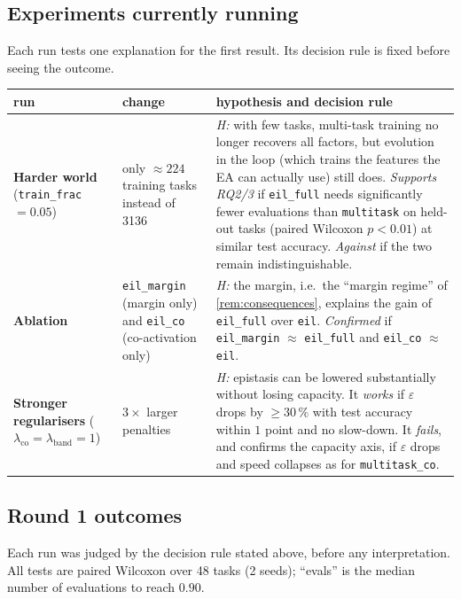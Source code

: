 \documentclass[11pt,a4paper]{article}
\theoremstyle{definition}
\theoremstyle{plain}
\theoremstyle{remark}
\begin{document}
\subsection{Experiments currently running}
Each run tests one explanation for the first result. Its decision rule is fixed before seeing the outcome.

\begin{center}
\small
\begin{tabularx}{\linewidth}{@{}L{2.4cm}L{3.6cm}Y@{}}
\toprule
run & change & hypothesis and decision rule \\
\midrule
\textbf{Harder world} (\texttt{train\_frac}$=0.05$) & only $\approx224$ training tasks instead of 3136 & \emph{H:} with few tasks, multi-task training no longer recovers all factors, but evolution in the loop (which trains the features the EA can actually use) still does.
\emph{Supports RQ2/3} if \texttt{eil\_full} needs significantly fewer evaluations than \texttt{multitask} on held-out tasks (paired Wilcoxon $p<0.01$) at similar test accuracy. \emph{Against} if the two remain indistinguishable. \\
\textbf{Ablation} & \texttt{eil\_margin} (margin only) and \texttt{eil\_co} (co-activation only) & \emph{H:} the margin, i.e.\ the ``margin regime'' of \cref{rem:consequences}, explains the gain of \texttt{eil\_full} over \texttt{eil}.
\emph{Confirmed} if \texttt{eil\_margin} $\approx$ \texttt{eil\_full} and \texttt{eil\_co} $\approx$ \texttt{eil}. \\
\textbf{Stronger regularisers} ($\lambda_{\text{co}}=\lambda_{\text{band}}=1$) & $3\times$ larger penalties & \emph{H:} epistasis can be lowered substantially without losing capacity. It \emph{works} if $\varepsilon$ drops by $\ge30\,\%$ with test accuracy within $1$ point and no slow-down. It \emph{fails}, and confirms the capacity axis, if $\varepsilon$ drops and speed collapses as for \texttt{multitask\_co}. \\
\bottomrule
\end{tabularx}
\end{center}

\subsection{Round 1 outcomes}
Each run was judged by the decision rule stated above, before any interpretation. All tests are paired Wilcoxon over 48 tasks (2 seeds); ``evals'' is the median number of evaluations to reach $0.90$.
\end{document}

